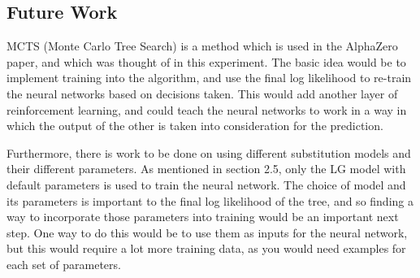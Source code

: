 \documentclass{mpaper}
\begin{document}
\subsection{Future Work}

MCTS (Monte Carlo Tree Search) is a method which is used in the AlphaZero paper, and which was thought of in this experiment. The basic idea would be to implement training into the algorithm, and use the final log likelihood to re-train the neural networks based on decisions taken. This would add another layer of reinforcement learning, and could teach the neural networks to work in a way in which the output of the other is taken into consideration for the prediction.

Furthermore, there is work to be done on using different substitution models and their different parameters. As mentioned in section 2.5, only the LG model with default parameters is used to train the neural network. The choice of model and its parameters is important to the final log likelihood of the tree, and so finding a way to incorporate those parameters into training would be an important next step. One way to do this would be to use them as inputs for the neural network, but this would require a lot more training data, as you would need examples for each set of parameters.






\end{document}
